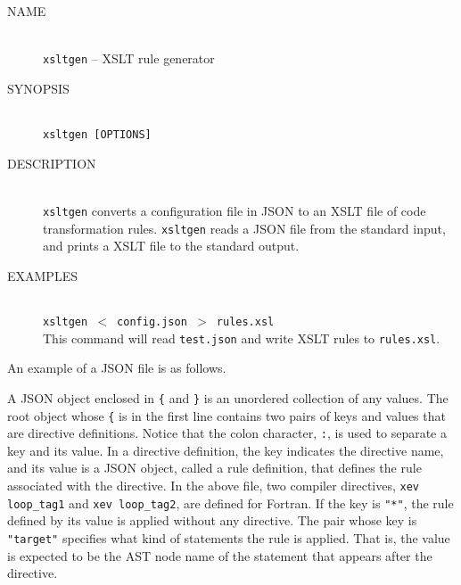 \begin{framed}
\begin{description}
 \item[NAME]~\\
	    \texttt{xsltgen} -- XSLT rule generator

 \item[SYNOPSIS]~\\
	    \texttt{xsltgen [OPTIONS] }

 \item[DESCRIPTION]~\\ \texttt{xsltgen} converts a configuration file in
	    JSON to an XSLT file of code transformation rules.
	    \texttt{xsltgen} reads a JSON file from the standard input,
	    and prints a XSLT file to the standard
	    output. 

 \item[EXAMPLES]~\\ \texttt{xsltgen $<$ config.json $>$ rules.xsl}\\ This command
	    will read \texttt{test.json} and write XSLT rules to \texttt{rules.xsl}.
\end{description}
\end{framed}

An example of a JSON file is as follows.
\begin{framed}
\end{framed}

A JSON object enclosed in \texttt{\{} and \texttt{\}} is an unordered
collection of any values. The root object whose \texttt{\{} is in the
first line contains two pairs of keys and values that are directive
definitions.  Notice that the colon character, \texttt{:}, is used to
separate a key and its value. In a directive definition, the key
indicates the directive name, and its value is a JSON object, called a
rule definition, that defines the rule associated with the directive.
In the above file, two compiler directives, \texttt{xev loop\_tag1} and
\texttt{xev loop\_tag2}, are defined for Fortran. If the key is
\texttt{"*"}, the rule defined by its value is applied without any
directive. The pair whose key is \texttt{"target"} specifies what kind
of statements the rule is applied. That is, the value is expected to be
the AST node name of the statement that appears after the directive.

